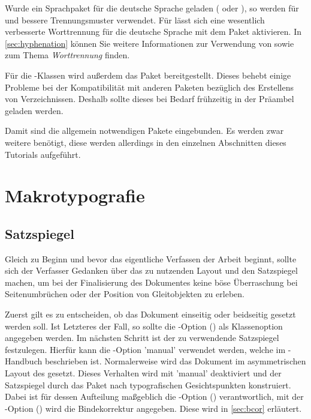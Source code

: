 \documentclass[%
  english,ngerman,%
  cdgeometry=no,DIV=12,%
  automark,%
  listof=toc,%
]{tudscrartcl}
\begin{document}
Wurde ein Sprachpaket für die deutsche Sprache geladen ( oder 
), so werden für  und  
bessere Trennungsmuster verwendet. Für  lässt sich eine 
wesentlich verbesserte Worttrennung für die deutsche Sprache mit dem Paket 
 aktivieren. In \autoref{sec:hyphenation} können Sie weitere 
Informationen zur Verwendung von  sowie zum Thema 
\emph{Worttrennung} finden.
%
\begin{Preamble}
\ifpdftex{
  \usepackage[T1]{fontenc}
  \usepackage[ngerman=ngerman-x-latest]{hyphsubst}
}{
  \usepackage{fontspec}
}
\end{Preamble}
%
Für die \KOMAScript-Klassen wird außerdem das Paket  
bereitgestellt. Dieses behebt einige Probleme bei der Kompatibilität mit 
anderen Paketen bezüglich des Erstellens von Verzeichnissen. Deshalb sollte 
dieses bei Bedarf frühzeitig in der Präambel geladen werden. 
%
\begin{Preamble}
\usepackage{scrhack}
\end{Preamble}
%
Damit sind die allgemein notwendigen Pakete eingebunden. Es werden zwar weitere 
benötigt, diese werden allerdings in den einzelnen Abschnitten dieses Tutorials 
aufgeführt.



\section{Makrotypografie}
\subsection{Satzspiegel}
Gleich zu Beginn und bevor das eigentliche Verfassen der Arbeit beginnt, sollte 
sich der Verfasser Gedanken über das zu nutzenden Layout und den Satzspiegel 
machen, um bei der Finalisierung des Dokumentes keine böse Überraschung bei 
Seitenumbrüchen oder der Position von Gleitobjekten zu erleben.

Zuerst gilt es zu entscheiden, ob das Dokument einseitig oder beidseitig 
gesetzt werden soll. Ist Letzteres der Fall, so sollte die \KOMAScript-Option 
() als Klassenoption angegeben werden. Im 
nächsten Schritt ist der zu verwendende Satzspiegel festzulegen. Hierfür kann 
die \TUDScript-Option 'manual' verwendet werden, welche im 
\TUDScript-Handbuch beschrieben ist. Normalerweise wird das Dokument im 
asymmetrischen Layout des \CDs gesetzt.
%
Dieses Verhalten wird mit 'manual' deaktiviert und 
der Satzspiegel durch das Paket  nach typografischen 
Gesichtspunkten konstruiert. Dabei ist für dessen Aufteilung maßgeblich die 
\KOMAScript-Option () verantwortlich, mit der 
\KOMAScript-Option () wird die Bindekorrektur 
angegeben. Diese wird in \autoref{sec:bcor} erläutert.
\end{document}
